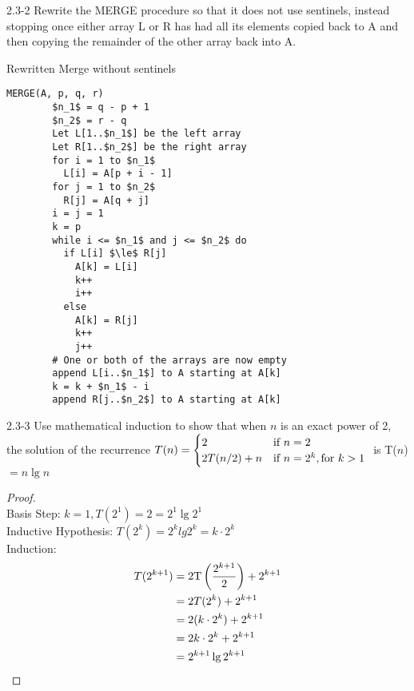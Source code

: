 \begin{problem}{2.3-2}
  Rewrite the MERGE procedure so that it does not use sentinels, instead stopping once either array L or R has had all its
  elements copied back to A and then copying the remainder of the other array back into A.

  \begin{solution}
   \centerline{Rewritten Merge without sentinels}
    \begin{lstlisting}[mathescape]
      MERGE(A, p, q, r)
        $n_1$ = q - p + 1
        $n_2$ = r - q
        Let L[1..$n_1$] be the left array
        Let R[1..$n_2$] be the right array
        for i = 1 to $n_1$
          L[i] = A[p + i - 1]
        for j = 1 to $n_2$
          R[j] = A[q + j]
        i = j = 1
        k = p
        while i <= $n_1$ and j <= $n_2$ do
          if L[i] $\le$ R[j]
            A[k] = L[i]
            k++
            i++
          else
            A[k] = R[j]
            k++
            j++
        # One or both of the arrays are now empty
        append L[i..$n_1$] to A starting at A[k]
        k = k + $n_1$ - i
        append R[j..$n_2$] to A starting at A[k]
    \end{lstlisting}
  \end{solution}
\end{problem} \newpage

\begin{problem}{2.3-3}
  Use mathematical induction to show that when $n$ is an exact power of 2, the solution of the recurrence
  $T(n) = \begin{cases}
    2 & \text{if } n = 2 \\
    2T(n/2) + n & \text{if } n = 2^k, \text{for } k >1
  \end{cases} \\
  $ is T($n$)$=n \lg n$
  \begin{solution}
    \begin{proof}\ \\
      Basis Step: $k = 1, T(2^1) = 2 = 2^1 \lg 2^1$ \\
      Inductive Hypothesis: $T(2^k) = 2^k lg 2^k = k \cdot 2^k$ \\
      Induction: \begin{align*}
        T(2^{k+1}) &= 2\text{T}\left(\frac{2^{k+1}}{2}\right) + 2^{k+1} \\
        &= 2T(2^k) + 2^{k+1} \\
        &= 2(k \cdot 2^k) + 2^{k+1} \\
        &= 2k \cdot 2^k + 2^{k+1} \\
        &= 2^{k + 1} \lg 2^{k+1} \qedhere
      \end{align*}

    \end{proof}
  \end{solution}
\end{problem}

